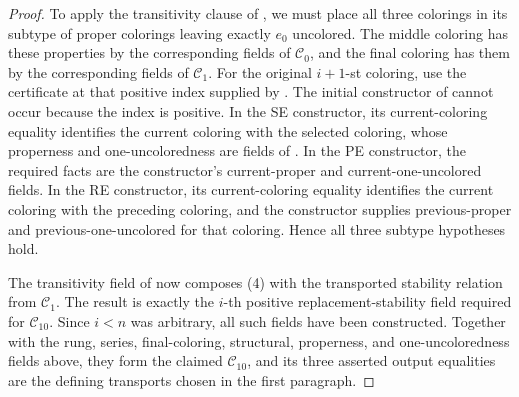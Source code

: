 \begin{proof}
To apply the transitivity clause of , we must place all three
colorings in its subtype of proper colorings leaving exactly \(e_0\)
uncolored.  The middle coloring has these properties by the corresponding
fields of \(\mathcal C_0\), and the final coloring has them by the
corresponding fields of \(\mathcal C_1\).  For the original \(i+1\)-st
coloring, use the certificate at that positive index supplied by
.  The initial constructor of
 cannot occur because the index is positive.
In the SE constructor, its current-coloring equality identifies the
current coloring with the selected coloring, whose properness and
one-uncoloredness are fields of .  In the
PE constructor, the required facts are the constructor's current-proper
and current-one-uncolored fields.  In the RE constructor, its
current-coloring equality identifies the current coloring with the
preceding coloring, and the constructor supplies previous-proper and
previous-one-uncolored for that coloring.  Hence all three subtype
hypotheses hold.

The transitivity field of  now composes (4) with the
transported stability relation from \(\mathcal C_1\).  The result is
exactly the \(i\)-th positive replacement-stability field required for
\(\mathcal C_{10}\).  Since \(i<n\) was arbitrary, all such fields have
been constructed.  Together with the rung, series, final-coloring,
structural, properness, and one-uncoloredness fields above, they form the
claimed \(\mathcal C_{10}\), and its three asserted output equalities are
the defining transports chosen in the first paragraph.
\end{proof}
